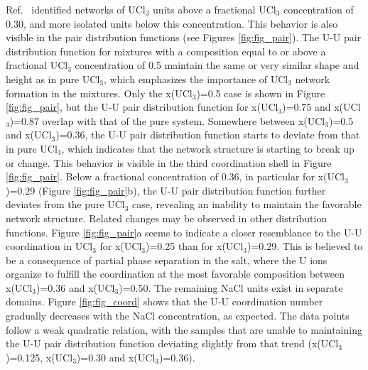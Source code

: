 \documentclass[preprint,3p,10pt,onecolumn,number,sort&compress]{elsarticle}
\begin{document}
{Ref.~\cite{Li} identified networks of UCl$_3$ units above a fractional UCl$_3$ concentration of 0.30, and more isolated units below this concentration. This behavior is also visible in the pair distribution functions (see Figures \ref{fig:fig_pair}). The U-U pair distribution function for mixtures with a composition equal to or above a fractional UCl$_3$ concentration of 0.5 maintain the same or very similar shape and height as in pure UCl$_3$, which emphasizes the importance of UCl$_3$ network formation in the mixtures. Only the x(UCl$_3$)=0.5 case is shown in Figure \ref{fig:fig_pair}, but the U-U pair distribution function for x(UCl$_3$)=0.75 and x(UCl$_3$)=0.87 overlap with that of the pure system. Somewhere between x(UCl$_3$)=0.5 and x(UCl$_3$)=0.36, the U-U pair distribution function starts to deviate from that in pure UCl$_3$, which indicates that the network structure is starting to break up or change. This behavior is visible in the third coordination shell in Figure \ref{fig:fig_pair}. %
Below a fractional concentration of 0.36, in particular for x(UCl$_3$)=0.29 (Figure \ref{fig:fig_pair}b), the U-U pair distribution function further deviates from the pure UCl$_3$ case, revealing an inability to maintain the favorable network structure. %
Related changes may be observed in other distribution functions. Figure \ref{fig:fig_pair}a seems to indicate a closer resemblance to the U-U coordination in UCl$_3$ for x(UCl$_3$)=0.25 than for x(UCl$_3$)=0.29. This is believed to be a consequence of partial phase separation in the salt, where the U ions organize to fulfill the coordination at the most favorable composition between x(UCl$_3$)=0.36 and x(UCl$_3$)=0.50. The remaining NaCl units exist in separate domains. %
Figure \ref{fig:fig_coord} shows that the U-U coordination number gradually decreases with the NaCl concentration, as expected. The data points follow a weak quadratic relation, with the samples that are unable to maintaining the U-U pair distribution function deviating slightly from that trend (x(UCl$_3$)=0.125, x(UCl$_3$)=0.30 and x(UCl$_3$)=0.36).
}
\end{document}
